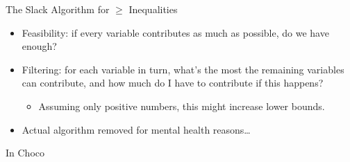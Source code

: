 \documentclass{beamer}
\begin{document}
\begin{frame}{The Slack Algorithm for $\ge$ Inequalities}
    \begin{itemize}
        \item Feasibility: if every variable contributes as much as possible,
            do we have enough?
        \item Filtering: for each variable in turn, what's the most the
            remaining variables can contribute, and how much do I have to
            contribute if this happens?
            \begin{itemize}
                \item Assuming only positive numbers, this might increase lower bounds.
            \end{itemize}
        \item Actual algorithm removed for mental health reasons\ldots
    \end{itemize}
\end{frame}

\begin{frame}[fragile]{In Choco}
     {
        
    }
     {
        \begin{minipage}{0.47\paperwidth}
        \end{minipage}\begin{minipage}{0.44\paperwidth}
        \end{minipage}
    }
\end{frame}
\end{document}
